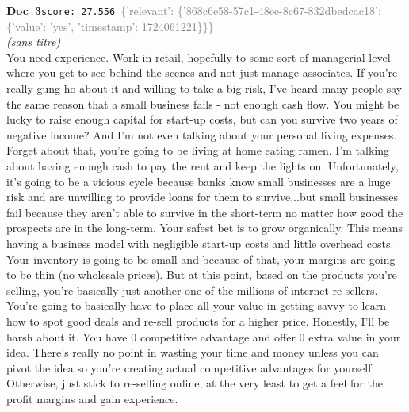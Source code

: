 \documentclass[a4paper,11pt]{article}
\begin{document}
\begin{docenv}
{\footnotesize\textcolor{doccolor}{\textbf{Doc~3}}}\hfill{\tiny\texttt{score:~27.556}}\ {\tiny\textcolor{gray}{\{'relevant': \{'868c6e58-57c1-48ee-8c67-832dbedcac18': \{'value': 'yes', 'timestamp': 1724061221\}\}\}}}\\[3pt]
{\small\textit{(sans titre)}}\\[2pt]
\vspace{2pt}
{\footnotesize 
You need experience. Work in retail, hopefully to some sort of managerial level where you get to see behind the scenes and not just manage associates.  If you're really gung-ho about it and willing to take a big risk, I've heard many people say the same reason that a small business fails - not enough cash flow. You might be lucky to raise enough capital for start-up costs, but can you survive two years of negative income? And I'm not even talking about your personal living expenses. Forget about that, you're going to be living at home eating ramen. I'm talking about having enough cash to pay the rent and keep the lights on. Unfortunately, it's going to be a vicious cycle because banks know small businesses are a huge risk and are unwilling to provide loans for them to survive...but small businesses fail because they aren't able to survive in the short-term no matter how good the prospects are in the long-term.   Your safest bet is to grow organically. This means having a business model with negligible start-up costs and little overhead costs. Your inventory is going to be small and because of that, your margins are going to be thin (no wholesale prices). But at this point, based on the products you're selling, you're basically just another one of the millions of internet re-sellers. You're going to basically have to place all your value in getting savvy to learn how to spot good deals and re-sell products for a higher price.   Honestly, I'll be harsh about it. You have 0 competitive advantage and offer 0 extra value in your idea. There's really no point in wasting your time and money unless you can pivot the idea so you're creating actual competitive advantages for yourself. Otherwise, just stick to re-selling online, at the very least to get a feel for the profit margins and gain experience.}
\end{docenv}
\end{document}
